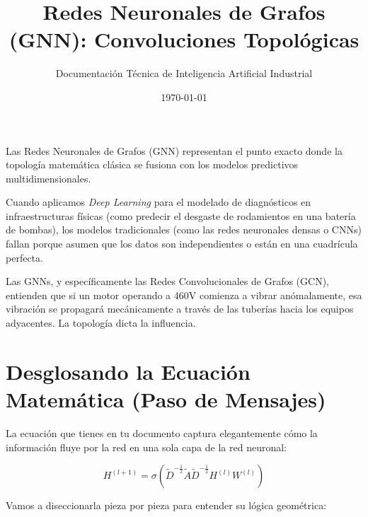 \documentclass[12pt,a4paper]{article}
\title{\textbf{\color{darkblue}Redes Neuronales de Grafos (GNN): Convoluciones Topológicas}}
\author{Documentación Técnica de Inteligencia Artificial Industrial}
\date{\today}
\begin{document}
\maketitle

\noindent Las Redes Neuronales de Grafos (GNN) representan el punto exacto donde la topología matemática clásica se fusiona con los modelos predictivos multidimensionales.

Cuando aplicamos \textit{Deep Learning} para el modelado de diagnósticos en infraestructuras físicas (como predecir el desgaste de rodamientos en una batería de bombas), los modelos tradicionales (como las redes neuronales densas o CNNs) fallan porque asumen que los datos son independientes o están en una cuadrícula perfecta.

Las GNNs, y específicamente las Redes Convolucionales de Grafos (GCN), entienden que si un motor operando a 460V comienza a vibrar anómalamente, esa vibración se propagará mecánicamente a través de las tuberías hacia los equipos adyacentes. La topología dicta la influencia.

\section{Desglosando la Ecuación Matemática (Paso de Mensajes)}

La ecuación que tienes en tu documento captura elegantemente cómo la información fluye por la red en una sola capa de la red neuronal:

\begin{equation}
    H^{(l+1)} = \sigma \left( \tilde{D}^{-\frac{1}{2}} \tilde{A} \tilde{D}^{-\frac{1}{2}} H^{(l)} W^{(l)} \right)
\end{equation}

Vamos a diseccionarla pieza por pieza para entender su lógica geométrica:
\end{document}
